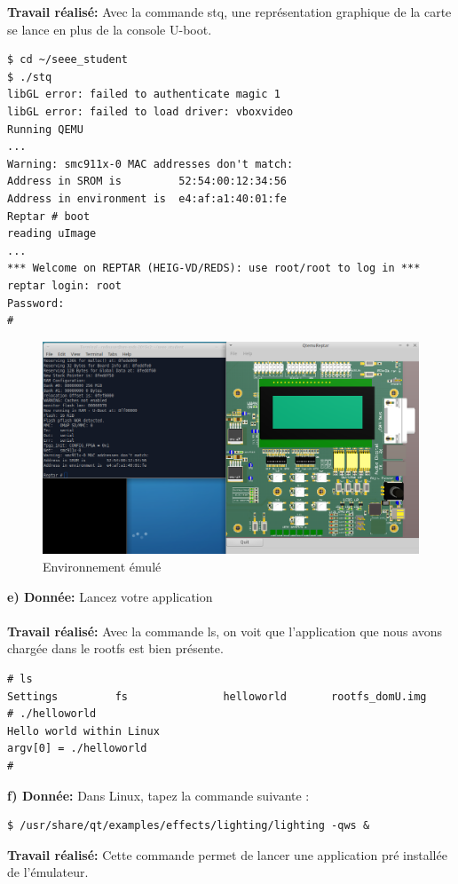 \textbf{Travail réalisé: } Avec la commande stq, une représentation graphique de la carte se lance en plus de la console U-boot.
\begin{lstlisting}
$ cd ~/seee_student
$ ./stq 
libGL error: failed to authenticate magic 1
libGL error: failed to load driver: vboxvideo
Running QEMU
...
Warning: smc911x-0 MAC addresses don't match:
Address in SROM is         52:54:00:12:34:56
Address in environment is  e4:af:a1:40:01:fe
Reptar # boot
reading uImage
...
*** Welcome on REPTAR (HEIG-VD/REDS): use root/root to log in ***
reptar login: root
Password: 
# 
\end{lstlisting}
\begin{figure}[H]
	\begin{center}
		\includegraphics[width=18cm]{img/linux.png}
		\caption{Environnement émulé}
		\label{linux}
	\end{center}
\end{figure}
\textbf{e) Donnée: }Lancez votre application\\\\
\textbf{Travail réalisé: } Avec la commande ls, on voit que l'application que nous avons chargée dans le rootfs est bien présente.
\begin{lstlisting}
# ls
Settings         fs               helloworld       rootfs_domU.img
# ./helloworld 
Hello world within Linux
argv[0] = ./helloworld
# 
\end{lstlisting}
\textbf{f) Donnée: }Dans Linux, tapez la commande suivante :
\begin{lstlisting}
$ /usr/share/qt/examples/effects/lighting/lighting -qws & 
\end{lstlisting}
\textbf{Travail réalisé: }Cette commande permet de lancer une application pré installée de l'émulateur.
